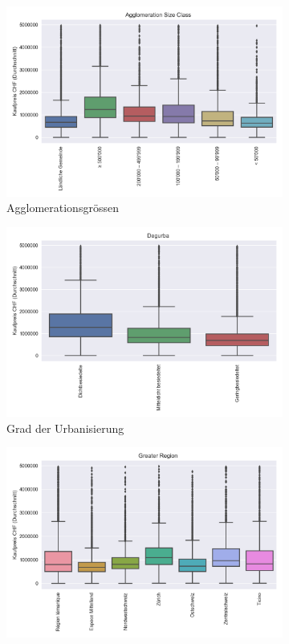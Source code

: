 \begin{figure}[h]
\begin{subfigure}{.5\textwidth}
  \centering
  \includegraphics[width=\linewidth]{images/anhang/analysis/boxplot_agglomeration_size_class_id.png}
  \caption{Agglomerationsgrössen}
\end{subfigure}
\begin{subfigure}{.5\textwidth}
  \centering
  \includegraphics[width=\linewidth]{images/anhang/analysis/boxplot_degurba_id.png}
  \caption{Grad der Urbanisierung}
\end{subfigure}
\begin{subfigure}{.5\textwidth}
  \centering
  \includegraphics[width=\linewidth]{images/anhang/analysis/boxplot_greater_region_id.png}

\end{subfigure}
\end{figure}
